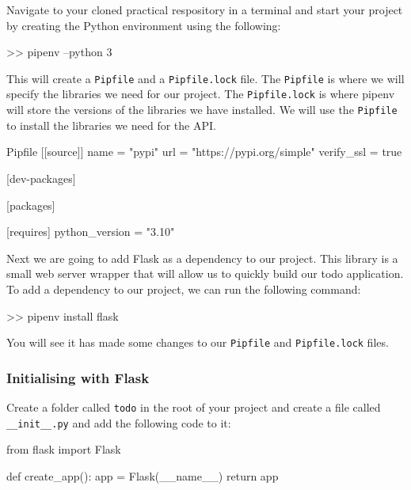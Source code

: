 \documentclass{csse4400}
\begin{document}
Navigate to your cloned practical respository in a terminal and start your project by creating the Python environment using the following:

\begin{code}[language=bash,numbers=none]{}
  >> pipenv --python 3
\end{code}

This will create a \texttt{Pipfile} and a \texttt{Pipfile.lock} file.
The \texttt{Pipfile} is where we will specify the libraries we need for our project.
The \texttt{Pipfile.lock} is where pipenv will store the versions of the libraries we have installed.
We will use the \texttt{Pipfile} to install the libraries we need for the API.

\begin{code}{Pipfile}
  [[source]]
  name = "pypi"
  url = "https://pypi.org/simple"
  verify_ssl = true

  [dev-packages]

  [packages]

  [requires]
  python_version = "3.10"
\end{code}


Next we are going to add Flask as a dependency to our project. This library is a small web server wrapper that will allow us to quickly build our todo application. To add a dependency to our project, we can run the following command:

\begin{code}[language=bash,numbers=none]{}
  >>  pipenv install flask
\end{code}

You will see it has made some changes to our \texttt{Pipfile} and \texttt{Pipfile.lock} files.

\subsubsection{Initialising with Flask}

Create a folder called  \texttt{todo} in the root of your project and create a file called \texttt{\_\_init\_\_.py} and add the following code to it:

\begin{code}[language=python]{}
  from flask import Flask

  def create_app():
      app = Flask(__name__)
      return app
\end{code}
\end{document}
